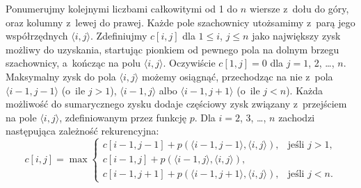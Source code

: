 Ponumerujmy kolejnymi liczbami całkowitymi od 1 do $n$ wiersze z~dołu do góry, oraz kolumny z~lewej do prawej.
Każde pole szachownicy utożsamimy z~parą jego współrzędnych $\langle i,j\rangle$.
Zdefiniujmy $c[i,j]$ dla $1\le i$, $j\le n$ jako największy zysk możliwy do uzyskania, startując pionkiem od pewnego pola na dolnym brzegu szachownicy, a~kończąc na polu $\langle i,j\rangle$.
Oczywiście $c[1,j]=0$ dla $j=1$, 2, \dots, $n$.
Maksymalny zysk do pola $\langle i,j\rangle$ możemy osiągnąć, przechodząc na nie z~pola $\langle i-1,j-1\rangle$ (o~ile $j>1$), $\langle i-1,j\rangle$ albo $\langle i-1,j+1\rangle$ (o~ile $j<n$).
Każda możliwość do sumarycznego zysku dodaje częściowy zysk związany z~przejściem na pole $\langle i,j\rangle$, zdefiniowanym przez funkcję $p$.
Dla $i=2$, 3, \dots, $n$ zachodzi następująca zależność rekurencyjna:
\[
	c[i,j] = \max\begin{cases}
		c[i-1,j-1]+p(\langle i-1,j-1\rangle,\langle i,j\rangle), & \text{jeśli $j>1$,} \\
		c[i-1,j]+p(\langle i-1,j\rangle,\langle i,j\rangle), & \\
		c[i-1,j+1]+p(\langle i-1,j+1\rangle,\langle i,j\rangle), & \text{jeśli $j<n$.}
	\end{cases}
\]

